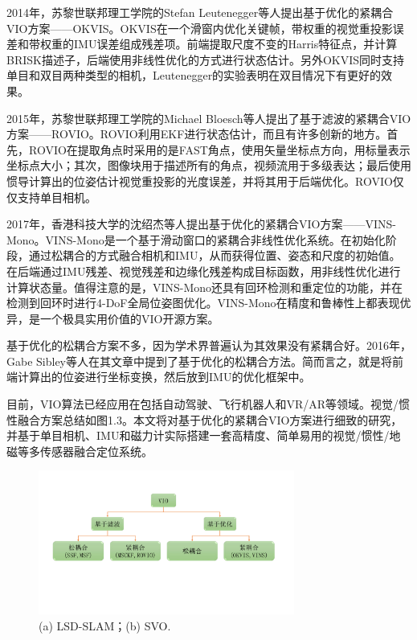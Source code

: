2014年，苏黎世联邦理工学院的Stefan Leutenegger等人提出基于优化的紧耦合VIO方案——OKVIS。OKVIS在一个滑窗内优化关键帧，带权重的视觉重投影误差和带权重的IMU误差组成残差项。前端提取尺度不变的Harris特征点，并计算BRISK描述子，后端使用非线性优化的方式进行状态估计。另外OKVIS同时支持单目和双目两种类型的相机，Leutenegger的实验表明在双目情况下有更好的效果。

2015年，苏黎世联邦理工学院的Michael Bloesch等人提出了基于滤波的紧耦合VIO方案——ROVIO。ROVIO利用EKF进行状态估计，而且有许多创新的地方。首先，ROVIO在提取角点时采用的是FAST角点，使用矢量坐标点方向，用标量表示坐标点大小；其次，图像块用于描述所有的角点，视频流用于多级表达；最后使用惯导计算出的位姿估计视觉重投影的光度误差，并将其用于后端优化。ROVIO仅仅支持单目相机。

2017年，香港科技大学的沈绍杰等人提出基于优化的紧耦合VIO方案——VINS-Mono。VINS-Mono是一个基于滑动窗口的紧耦合非线性优化系统。在初始化阶段，通过松耦合的方式融合相机和IMU，从而获得位置、姿态和尺度的初始值。在后端通过IMU残差、视觉残差和边缘化残差构成目标函数，用非线性优化进行计算状态量。值得注意的是，VINS-Mono还具有回环检测和重定位的功能，并在检测到回环时进行4-DoF全局位姿图优化。VINS-Mono在精度和鲁棒性上都表现优异，是一个极具实用价值的VIO开源方案。

基于优化的松耦合方案不多，因为学术界普遍认为其效果没有紧耦合好。2016年，Gabe Sibley等人在其文章中提到了基于优化的松耦合方法。简而言之，就是将前端计算出的位姿进行坐标变换，然后放到IMU的优化框架中。

目前，VIO算法已经应用在包括自动驾驶、飞行机器人和VR/AR等领域。视觉/惯性融合方案总结如图1.3。本文将对基于优化的紧耦合VIO方案进行细致的研究，并基于单目相机、IMU和磁力计实际搭建一套高精度、简单易用的视觉/惯性/地磁等多传感器融合定位系统。

\begin{figure}[h]\setlength{\belowcaptionskip}{-12pt}
	\centering
	\includegraphics[width=0.75\textwidth]{figures/chapter1/fig1_3}
	\caption{(a) LSD-SLAM；(b) SVO.}\label{fig1_3}
\end{figure}

